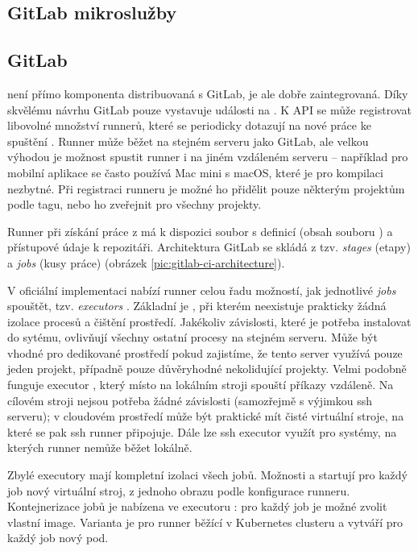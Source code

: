     \subsection{GitLab mikroslužby}
        \blind[1]
        \blind[1]
        \blind[1]

    \subsection{GitLab \CI}
        \CI není přímo komponenta distribuovaná s GitLab, je ale dobře zaintegrovaná. Díky skvělému návrhu GitLab pouze vystavuje události na . K API se může registrovat libovolné množství runnerů, které se periodicky  dotazují na nové práce ke spuštění \cite{gitlab-runner-registration}. Runner může běžet na stejném serveru jako GitLab, ale velkou výhodou je možnost spustit runner i na jiném vzdáleném serveru -- například pro mobilní aplikace se často používá Mac mini s macOS, které je pro kompilaci nezbytné. Při registraci runneru je možné ho přidělit pouze některým projektům podle tagu, nebo ho zveřejnit pro všechny projekty. 

        Runner při získání práce z  má k dispozici soubor s definicí (obsah souboru  \cite{gitlab-runner-yaml}) a přístupové údaje k repozitáři. Architektura GitLab \CI se skládá z tzv. \textit{stages} (etapy) a \textit{jobs} (kusy práce) (obrázek \ref{pic:gitlab-ci-architecture}).


        V oficiální implementaci nabízí runner celou řadu možností, jak jednotlivé \textit{jobs} spouštět, tzv. \textit{executors} \cite{gitlab-runner-config}. Základní je , při kterém neexistuje prakticky žádná izolace procesů a čištění prostředí. Jakékoliv závislosti, které je potřeba instalovat do sytému, ovlivňují všechny ostatní procesy na stejném serveru. Může být vhodné pro dedikované prostředí pokud zajistíme, že tento server využívá pouze jeden projekt, případně pouze důvěryhodné nekolidující projekty. Velmi podobně funguje executor , který místo na lokálním stroji spouští příkazy vzdáleně. Na cílovém stroji nejsou potřeba žádné závislosti (samozřejmě s výjimkou ssh serveru); v cloudovém prostředí může být praktické mít čisté virtuální stroje, na které se pak ssh runner připojuje. Dále lze ssh executor využít pro systémy, na kterých runner nemůže běžet lokálně.

        Zbylé executory mají kompletní izolaci všech jobů. Možnosti  a  startují pro každý job nový virtuální stroj, z jednoho obrazu podle konfigurace runneru. Kontejnerizace jobů je nabízena ve executoru : pro každý job je možné zvolit vlastní image. Varianta  je pro runner běžící v Kubernetes clusteru a vytváří pro každý job nový pod.

